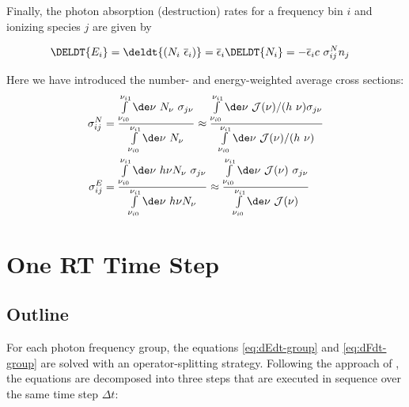 Finally, the photon absorption (destruction) rates for a frequency bin $i$ and ionizing species $j$
are given by

\begin{align}
\DELDT{E_i} &=
    \deldt{(N_i \ \overline{\epsilon}_i)} =
    \overline{\epsilon}_i \DELDT{N_i} =
    -\overline{\epsilon}_i c \ \sigma_{i j} ^ N n_j
\end{align}


Here we have introduced the number- and energy-weighted average cross sections:
\begin{align}
\sigma_{ij}^N &=
		\frac{
			\int\limits_{\nu_{i0}}^{\nu_{i1}}\de \nu \ N_\nu \ \sigma_{j\nu}
		} {
		  \int\limits_{\nu_{i0}}^{\nu_{i1}}\de \nu \ N_\nu
		}
		\approx
		\frac{
			\int\limits_{\nu_{i0}}^{\nu_{i1}}\de \nu \ \mathcal{J}(\nu) / (h \ \nu) \sigma_{j\nu}
		} {
  		\int\limits_{\nu_{i0}}^{\nu_{i1}}\de \nu \ \mathcal{J}(\nu) / (h \ \nu)
		} \label{eq:sigma_N}\\
\sigma_{ij}^E &=
		\frac{
			\int\limits_{\nu_{i0}}^{\nu_{i1}}\de \nu \ h \nu N_\nu \ \sigma_{j\nu}
		}	{
			\int\limits_{\nu_{i0}}^{\nu_{i1}}\de \nu \ h \nu N_\nu
		}
		\approx
		\frac{
			\int\limits_{\nu_{i0}}^{\nu_{i1}}\de \nu \ \mathcal{J}(\nu) \  \sigma_{j\nu}
		}	{
			\int\limits_{\nu_{i0}}^{\nu_{i1}}\de \nu \ \mathcal{J}(\nu)
		} \label{eq:sigma_E}
\end{align}








\section{One RT Time Step}



\subsection{Outline}\label{chap:rt-numerics-outline}


For each photon frequency group, the equations \ref{eq:dEdt-group} and \ref{eq:dFdt-group} are
solved with an operator-splitting strategy. Following the approach of \cite{ramses-rt13}, the
equations are decomposed into three steps that are executed in sequence over the same time step
$\Delta t$:

